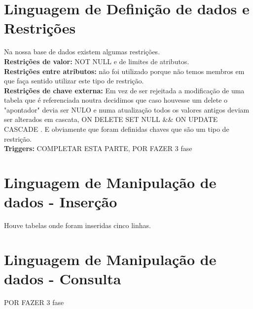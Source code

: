 \documentclass[a4paper]{article}
\begin{document}
\section{Linguagem de Definição de dados e Restrições}
Na nossa base de dados existem algumas restrições. \\
\textbf{Restrições de valor:} NOT NULL e de limites de atributos. \\
\textbf{Restrições entre atributos:} não foi utilizado porque não temos membros em que faça sentido utilizar este tipo de restrição. \\
\textbf{Restrições de chave externa:} Em vez de ser rejeitada a modificação de uma tabela que é referenciada noutra decidimos que caso houvesse um delete o "apontador" devia ser NULO e numa atualização todos os valores antigos deviam ser alterados em cascata, ON DELETE SET NULL \&\& ON UPDATE CASCADE .
E obviamente que foram definidas chaves que são um tipo de restrição. \\
\textbf{Triggers:} COMPLETAR ESTA PARTE, POR FAZER 3 fase
\section{Linguagem de Manipulação de dados - Inserção}
Houve tabelas onde foram inseridas cinco linhas.

\section{Linguagem de Manipulação de dados - Consulta}
POR FAZER 3 fase


\end{document}
